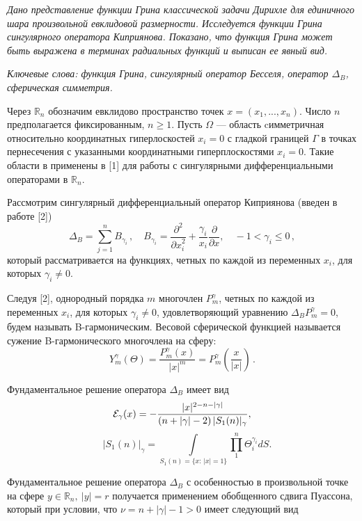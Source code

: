 

\vzmscaption

\textit{Дано представление функции Грина классической задачи Дирихле для единичного шара произвольной евклидовой размерности. Исследуется   функции Грина сингулярного оператора Киприянова. Показано, что функция Грина может быть выражена в терминах радиальных функций и выписан ее явный вид.}

\textit{Ключевые слова: функция Грина, сингулярный оператор Бесселя, оператор $\Delta_B$, сферическая симметрия.}

\medskip
Через $\mathbb{R}_n$ обозначим евклидово пространство точек 
$x=(x_1,...,x_n)$. Число $n$ предполагается фиксированным, $n\ge 1$.  Пусть $\Omega$ --- область cимметричная относительно  координатных гиперлоскостей $x_i=0$   
с гладкой границей $\Gamma$ в точках пернесечения с указанными координатными гиперплоскостями $x_i=0$.  Такие области в применены в [1] для работы с сингулярными дифференциальными операторами в  
$\mathbb{R}_n$. 

Рассмотрим сингулярный дифференциальный оператор Киприянова (введен в работе [2])
$$
\Delta_B = {\sum\limits_{j=1}^n B_{\gamma_i}}\,,\quad 
B_{\gamma_i}=\frac{\partial^2}{{\partial x}_i^2}+\frac{\gamma_i}{x_i}\frac{\partial}{\partial x}, \quad
-1<\gamma_i\le0\,,$$
который рассматривается на функциях, четных по каждой из переменных $x_i$, для которых $\gamma_i\neq0$.


Следуя [2], однородный порядка $m$ многочлен $P_{m}^{\gamma}$, четных по каждой из переменных $x_i$, для которых $\gamma_i\neq0$, удовлетворяющий уравнению $\Delta_B {P_{m}^{\gamma}}=0$, будем  называть B-гармоническим.
Весовой сферической функцией называется сужение B-гармонического многочлена на сферу:
$$
Y_{m}^{\gamma}(\Theta) = \frac{P_{m}^{\gamma}(x)}{|x|^m} = P_{m}^{\gamma}\left({\frac{x}{|x|}}\right)\,.
$$
 
Фундаментальное решение оператора $\Delta_B$ имеет вид
$${\cal E}_{\gamma}{(x)}=-\frac{|x|^{2-n-|\gamma|}}
{(n+|\gamma|-2)\,|S_1(n)|_\gamma},$$
$$\quad
|S_1(n)|_\gamma=\int\limits_{S_1(n)=\{x:\,|x|=1\}}
\prod\limits_1^n\Theta_i^{\gamma_i} dS.
$$

Фундаментальное решение оператора $\Delta_B$ с особенностью в произвольной точке на сфере $y\in\mathbb{R}_n,~|y|=r$ получается применением обобщенного сдвига Пуассона, который  при условии, что $\nu{=}n{+}|\gamma|{-}1{>}0$ имеет следующий вид 



